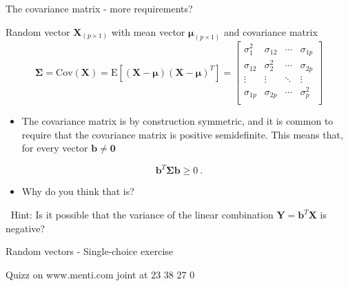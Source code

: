 \documentclass[
  ignorenonframetext,
]{beamer}
\providecommand{\tightlist}{%
  \setlength{\itemsep}{0pt}\setlength{\parskip}{0pt}}
\begin{document}
\begin{frame}
\begin{block}{The covariance matrix - more requirements?}
\protect\hypertarget{the-covariance-matrix---more-requirements}{}
\(~\)

Random vector \(\boldsymbol{X}_{(p\times 1)}\) with mean vector
\(\boldsymbol{\mu}_{(p\times 1)}\) and covariance matrix
\[\boldsymbol\Sigma=\text{Cov}(\boldsymbol{X})=\text{E}[(\boldsymbol{X}-\boldsymbol{\mu})(\boldsymbol{X}-\boldsymbol{\mu})^T]=
\left[ \begin{array}{cccc}
    \sigma_{1}^2 & \sigma_{12} & \cdots & \sigma_{1p}\\
    \sigma_{12} & \sigma_{2}^2 & \cdots & \sigma_{2p}\\
    \vdots & \vdots & \ddots & \vdots\\
    \sigma_{1p} & \sigma_{2p} & \cdots & \sigma_{p}^2\\
\end{array} \right]\]
\end{block}
\end{frame}

\begin{frame}
\begin{itemize}
\tightlist
\item
  The covariance matrix is by construction symmetric, and it is common
  to require that the covariance matrix is positive semidefinite. This
  means that, for every vector \(\boldsymbol{b}\neq \boldsymbol{0}\)
\end{itemize}

\[\boldsymbol{b}^T \boldsymbol{\Sigma} \boldsymbol{b} \geq 0 \ .\]

\begin{itemize}
\tightlist
\item
  Why do you think that is?
\end{itemize}

\(~\) \pause Hint: Is it possible that the variance of the linear
combination \(\boldsymbol{Y}=\boldsymbol{b}^T\boldsymbol{X}\) is
negative?
\end{frame}

\begin{frame}
\begin{block}{Random vectors - Single-choice exercise}
\protect\hypertarget{random-vectors---single-choice-exercise}{}
\vspace{4mm}

Quizz on www.menti.com joint at 23 38 27 0
\end{block}
\end{frame}
\end{document}
